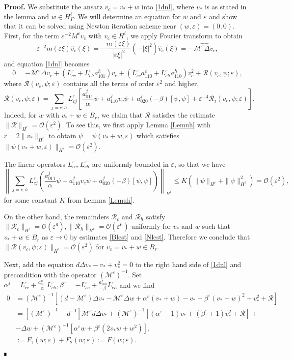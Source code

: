 \documentclass[letterpaper,11pt]{article}
\newcommand{\rmO}{\mathcal{O}}
\newcommand{\eps}{\varepsilon}
\newcommand{\Rm}{\mathcal{R}}
\newcommand{\M}{\mathcal{M}}
\numberwithin{equation}{section}
\theoremstyle{plain}
\theoremstyle{remark}
\newenvironment{Proof}[1][.]%
 {\begin{trivlist}\item[]\textbf{Proof#1 }}%
 {\hspace*{\fill}$\rule{0.3\baselineskip}{0.35\baselineskip}$\end{trivlist}}
\begin{document}
\begin{Proof}
We substitute the ansatz $v_c = v_* + w$ into \eqref{1dnl}, where $v_*$ is as stated in the lemma and $w \in H^\ell_{\Gamma}$. We will determine an equation for $w$ and $\eps$ and show that it can be solved using Newton iteration scheme near $(w,\eps)=(0,0)$.
First, for the term $\eps^{-2}M^\eps v_c$ with $v_c \in H^\ell$, we apply Fourier transform to obtain
\[
\eps^{-2}m(\eps\xi)\widehat{v}_c(\xi) = -\frac{m(\eps\xi)}{|\eps\xi|^2}(-|\xi|^2)\widehat{v}_c(\xi) = -\widehat{\M^\eps \Delta v_c},
\]
and equation \eqref{1dnl} becomes
\[
0 = -\M^\eps \Delta v_c + \left(L_{cc}^\eps +L_{ch}^\eps a_{101}^h\right)v_c+\left(L_{cc}^\eps a_{110}^c+L_{ch}^\eps a_{110}^h\right)v_c^2 + \Rm(v_c,\psi;\eps),
\]
where $\Rm(v_c,\psi;\eps)$ contains all the terms of order $\eps^2$ and higher,
\[
\Rm(v_c,\psi;\eps) =\sum_{j=c,h} L_{cj}^\eps\left[ \frac{a_{011}^j}{\alpha}\psi+a_{110}^j v_c\psi+a_{020}^j (-\beta)[\psi,\psi]+\eps^{-4}\Rm_j(v_c,\psi;\eps)\right].
\]
Indeed, for $w$ with $v_*+w \in B_r$, we claim that $\Rm$ satisfies the estimate $\|\Rm\|_{H^\ell} = \rmO(\eps^2)$.  To see this, we first apply Lemma \ref{Lemuh} with $r = 2\|v_*\|_{H^\ell}$ to obtain $\psi = \psi(v_*+w,\eps)$ which satisfies $\|\psi(v_*+w,\eps)\|_{H^\ell} = \rmO(\eps^2)$.

The linear operators $L_{cc}^\eps, L_{ch}^\eps$ are uniformly bounded in $\eps$, so that we have
\[
\left\|\sum_{j=c,h} L_{cj}^\eps\left( \frac{a_{011}^j}{\alpha}\psi+a_{110}^j v_c\psi+a_{020}^j (-\beta)[\psi,\psi]\right)\right\|_{H^\ell} \le K(\|\psi\|_{H^\ell}+\|\psi\|_{H^\ell}^2) = \rmO(\eps^2),
\]
for some constant $K$ from Lemma \ref{Lemuh}.

On the other hand, the remainders $\Rm_c$ and $\Rm_h$ satisfy $\|\Rm_c\|_{H^\ell}= \rmO(\eps^6), \|\Rm_h\|_{H^\ell} = \rmO(\eps^6)$ uniformly for $v_*$ and $w$ such that $v_* +w \in B_r$ as $\eps \to 0$ by  estimates \eqref{Blest} and \eqref{Nlest}. Therefore we conclude that $\|\Rm(v_c,\psi;\eps)\|_{H^\ell} = \rmO(\eps^2)$ for $v_c=v_*+w \in B_r$.
 
Next, add the equation $d\Delta v_*-v_*+v_*^2 =0$ to the right hand side of \eqref{1dnl} and precondition with the operator $(\M^{\eps})^{-1}$. Set $\alpha^\eps = L_{cc}^\eps + \frac{a_{101}^h}{\alpha} L_{ch}^\eps , \beta^\eps=-L_{cc}^\eps +\frac{a_{200}^h}{-\beta} L_{ch}^\eps $ and we find
\begin{eqnarray}
0 &=(\M^\eps)^{-1}\left[ (d-\M^\eps)\Delta v_* -\M^\eps \Delta w+\alpha^\eps(v_*+w)-v_*+\beta^\eps(v_*+w)^2+v_*^2 + \Rm \right] \nonumber \\ 
&= [(\M^{\eps})^{-1}-d^{-1}]\M^\eps d\Delta v_*+(\M^{\eps})^{-1}\left[ (\alpha^\eps-1)v_*+(\beta^\eps+1)v_*^2+\Rm \right]+ \nonumber \\
&-\Delta w+(\M^{\eps})^{-1}\left[\alpha^\eps w+\beta^\eps(2v_*w+w^2)\right], \nonumber \\
&:= F_1(w;\eps)+F_2(w;\eps):= F(w;\eps).  \label{splfynl}
\end{eqnarray}


\end{Proof}
\end{document}
